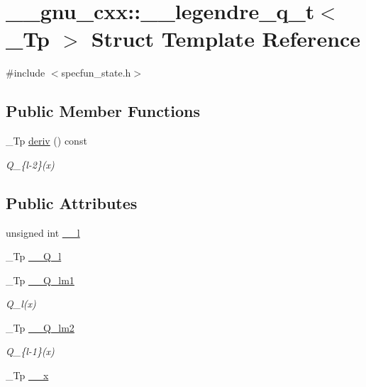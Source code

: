 \hypertarget{struct____gnu__cxx_1_1____legendre__q__t}{}\section{\+\_\+\+\_\+gnu\+\_\+cxx\+:\+:\+\_\+\+\_\+legendre\+\_\+q\+\_\+t$<$ \+\_\+\+Tp $>$ Struct Template Reference}
\label{struct____gnu__cxx_1_1____legendre__q__t}


{\ttfamily \#include $<$specfun\+\_\+state.\+h$>$}

\subsection*{Public Member Functions}
\begin{DoxyCompactItemize}
\item 
\+\_\+\+Tp \hyperlink{struct____gnu__cxx_1_1____legendre__q__t_a47e11f04ee7a2c0cec32a2ce4dacb297}{deriv} () const
\begin{DoxyCompactList}\small\item\em Q\+\_\+\{l-\/2\}(x) \end{DoxyCompactList}\end{DoxyCompactItemize}
\subsection*{Public Attributes}
\begin{DoxyCompactItemize}
\item 
unsigned int \hyperlink{struct____gnu__cxx_1_1____legendre__q__t_aaa8ceebd04ced598efdac0063b0b0b42}{\+\_\+\+\_\+l}
\item 
\+\_\+\+Tp \hyperlink{struct____gnu__cxx_1_1____legendre__q__t_ae072d12b69b451ad76fee9012e63ef4f}{\+\_\+\+\_\+\+Q\+\_\+l}
\item 
\+\_\+\+Tp \hyperlink{struct____gnu__cxx_1_1____legendre__q__t_a6078927fad183427aa5c6291d9390778}{\+\_\+\+\_\+\+Q\+\_\+lm1}
\begin{DoxyCompactList}\small\item\em Q\+\_\+l(x) \end{DoxyCompactList}\item 
\+\_\+\+Tp \hyperlink{struct____gnu__cxx_1_1____legendre__q__t_afad3335efa2e35e0899a04c4fc23be21}{\+\_\+\+\_\+\+Q\+\_\+lm2}
\begin{DoxyCompactList}\small\item\em Q\+\_\+\{l-\/1\}(x) \end{DoxyCompactList}\item 
\+\_\+\+Tp \hyperlink{struct____gnu__cxx_1_1____legendre__q__t_ab7913b1164f55ba47441d69dfbdd845b}{\+\_\+\+\_\+x}
\end{DoxyCompactItemize}


